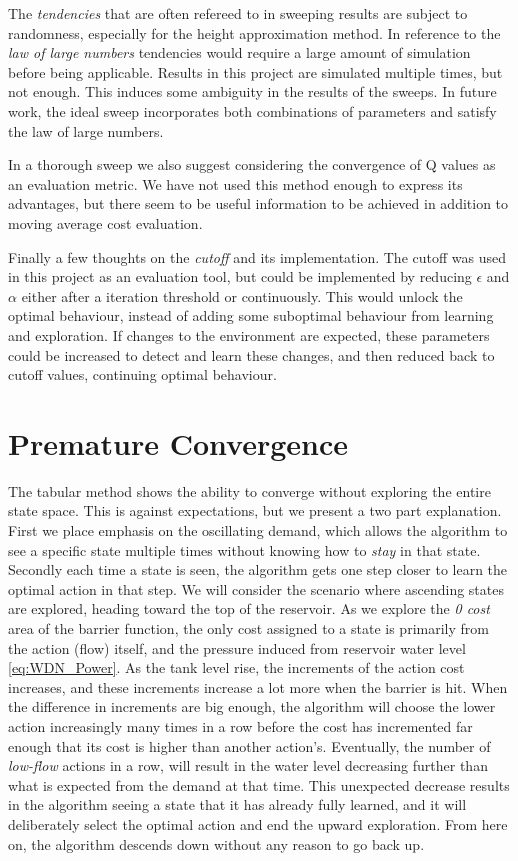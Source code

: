 The \textit{tendencies} that are often refereed to in sweeping results are subject to randomness, especially for the height approximation method. In reference to the \textit{law of large numbers} tendencies would require a large amount of simulation before being applicable. Results in this project are simulated multiple times, but not enough. This induces some ambiguity in the results of the sweeps. In future work, the ideal sweep incorporates both combinations of parameters and satisfy the law of large numbers.

In a thorough sweep we also suggest considering the convergence of Q values as an evaluation metric. We have not used this method enough to express its advantages, but there seem to be useful information to be achieved in addition to moving average cost evaluation.

Finally a few thoughts on the \textit{cutoff} and its implementation. The cutoff was used in this project as an evaluation tool, but could be implemented by reducing $\epsilon$ and $\alpha$ either after a iteration threshold or continuously. This would unlock the optimal behaviour, instead of adding some suboptimal behaviour from learning and exploration. If changes to the environment are expected, these parameters could be increased to detect and learn these changes, and then reduced back to cutoff values, continuing optimal behaviour.

\section{Premature Convergence}
The tabular method shows the ability to converge without exploring the entire state space. This is against expectations, but we present a two part explanation. First we place emphasis on the oscillating demand, which allows the algorithm to see a specific state multiple times without knowing how to \textit{stay} in that state. Secondly each time a state is seen, the algorithm gets one step closer to learn the optimal action in that step. We will consider the scenario where ascending states are explored, heading toward the top of the reservoir. As we explore the \textit{0 cost} area of the barrier function, the only cost assigned to a state is primarily from the action (flow) itself, and the pressure induced from reservoir water level \ref{eq:WDN_Power}. As the tank level rise, the increments of the action cost increases, and these increments increase a lot more when the barrier is hit. When the difference in increments are big enough, the algorithm will choose the lower action increasingly many times in a row before the cost has incremented far enough that its cost is higher than another action's. Eventually, the number of \textit{low-flow} actions in a row, will result in the water level decreasing further than what is expected from the demand at that time. This unexpected decrease results in the algorithm seeing a state that it has already fully learned, and it will deliberately select the optimal action and end the upward exploration. From here on, the algorithm descends down without any reason to go back up.

